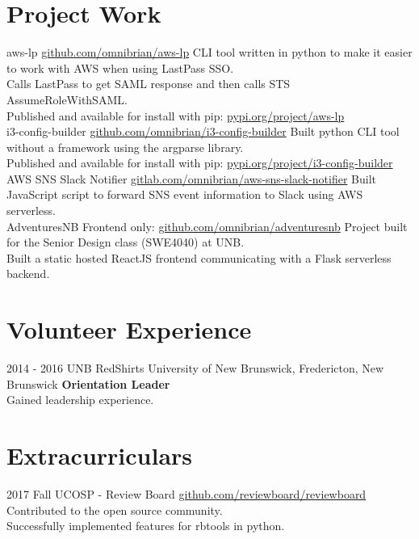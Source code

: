 \documentclass[a4paper]{resume}
\begin{document}
\section{Project Work}
\begin{entrylist}
  \wideentry
    {aws-lp}
    {\href{https://github.com/omnibrian/aws-lp}{github.com/omnibrian/aws-lp}}
    {CLI tool written in python to make it easier to work with AWS when using LastPass SSO.\\
    Calls LastPass to get SAML response and then calls STS AssumeRoleWithSAML.\\
    Published and available for install with pip: \href{https://pypi.org/project/aws-lp/}{pypi.org/project/aws-lp}\\}
  \wideentry
    {i3-config-builder}
    {\href{https://github.com/omnibrian/i3-config-builder}{github.com/omnibrian/i3-config-builder}}
    {Built python CLI tool without a framework using the argparse library.\\
    Published and available for install with pip: \href{https://pypi.org/project/i3-config-builder}{pypi.org/project/i3-config-builder}\\}
  \wideentry
    {AWS SNS Slack Notifier}
    {\href{https://gitlab.com/omnibrian/aws-sns-slack-notifier}{gitlab.com/omnibrian/aws-sns-slack-notifier}}
    {Built JavaScript script to forward SNS event information to Slack using AWS serverless.\\}
  \wideentry
    {AdventuresNB}
    {Frontend only: \href{https://github.com/omnibrian/adventuresnb}{github.com/omnibrian/adventuresnb}}
    {Project built for the Senior Design class (SWE4040) at UNB.\\
    Built a static hosted ReactJS frontend communicating with a Flask serverless backend.}
\end{entrylist}

\section{Volunteer Experience}
\begin{entrylist}
  \entry
    {2014 - 2016}
    {UNB RedShirts}
    {University of New Brunswick, Fredericton, New Brunswick}
    {\textbf{Orientation Leader}\\
    Gained leadership experience.}
\end{entrylist}

\section{Extracurriculars}
\begin{entrylist}
  \entry
    {2017 Fall}
    {UCOSP - Review Board}
    {\href{https://github.com/reviewboard/reviewboard}{github.com/reviewboard/reviewboard}}
    {Contributed to the open source community.\\
    Successfully implemented features for rbtools in python.}
\end{entrylist}
\end{document}
